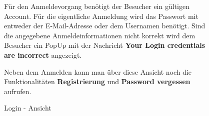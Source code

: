 \begin{figure}[H]
\begin{minipage}{.4\textwidth}
\begin{center}
        \end{center}
        \caption{Login - Ansicht}
        \label{fig:login}
    \end{minipage}%
    \begin{minipage}{.6\textwidth}
        \begin{changemargin}{0.5cm}{0cm}            
        Für den Anmeldevorgang benötigt der Besucher ein gültigen Account. Für die eigentliche Anmeldung wird das Passwort mit entweder der E-Mail-Adresse oder dem Usernamen benötigt. Sind die angegebene Anmeldeinformationen nicht korrekt wird dem Besucher ein PopUp mit der Nachricht \glqq \textbf{Your Login credentials are incorrect}\grqq{} angezeigt.

        Neben dem Anmelden kann man über diese Ansicht noch die Funktionalitäten \glqq \textbf{Registrierung}\grqq{} und \glqq \textbf{Password vergessen}\grqq{} aufrufen.
        \end{changemargin}
    \end{minipage}
\end{figure}

